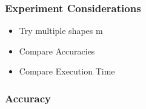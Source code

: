 \documentclass{beamer}
\begin{document}
\begin{frame}
  \frametitle{Experiment Considerations}

  \begin{itemize} 
    \item Try multiple shapes
m    \item Compare Accuracies
    \item Compare Execution Time
  \end{itemize}

\end{frame}

\begin{frame}
  \frametitle{Accuracy}

  \begin{figure}[!ht]
    \centering
    \scalebox{0.52}{
      }
  \end{figure}

\end{frame}

\begin{frame}

  \begin{figure}[ht]
	\centering
	\scalebox{0.64}{}
  \end{figure}

\end{frame}

\begin{frame}

  \begin{figure}[ht]
	\centering
	\scalebox{0.64}{}
  \end{figure}

\end{frame}

\begin{frame}

  \begin{figure}[ht]
	\centering
	\scalebox{0.64}{}
  \end{figure}

\end{frame}

\begin{frame}

  \begin{figure}[ht]
	\centering
	\scalebox{0.64}{}
  \end{figure}

\end{frame}
\end{document}

